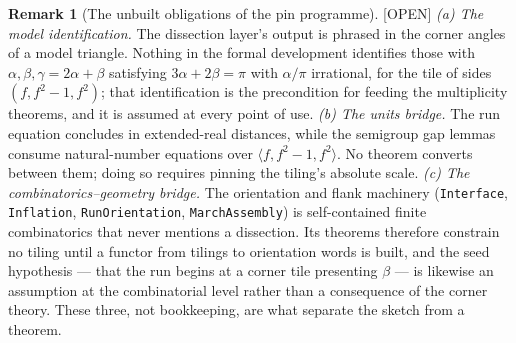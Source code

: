 \documentclass[11pt,reqno]{amsart}
\theoremstyle{plain}
\theoremstyle{definition}
\newtheorem{remark}[theorem]{Remark}
\newcommand{\lab}[1]{\hfill\textnormal{\footnotesize\textsc{[#1]}}}
\begin{document}
\begin{remark}[The unbuilt obligations of the pin programme]\label{rem:pingaps}\lab{OPEN}
\emph{(a) The model identification.} The dissection layer's output is phrased in the corner
angles of a model triangle. Nothing in the formal development identifies those with
$\alpha,\beta,\gamma=2\alpha+\beta$ satisfying $3\alpha+2\beta=\pi$ with $\alpha/\pi$
irrational, for the tile of sides $(f,f^2-1,f^2)$; that identification is the precondition for
feeding the multiplicity theorems, and it is assumed at every point of use.
\emph{(b) The units bridge.} The run equation concludes in extended-real distances, while the
semigroup gap lemmas consume natural-number equations over $\langle f,f^2-1,f^2\rangle$. No
theorem converts between them; doing so requires pinning the tiling's absolute scale.
\emph{(c) The combinatorics--geometry bridge.} The orientation and flank machinery
(\texttt{Interface}, \texttt{Inflation}, \texttt{RunOrientation}, \texttt{MarchAssembly}) is
self-contained finite combinatorics that never mentions a dissection. Its theorems therefore
constrain no tiling until a functor from tilings to orientation words is built, and the seed
hypothesis --- that the run begins at a corner tile presenting $\beta$ --- is likewise an
assumption at the combinatorial level rather than a consequence of the corner theory.
These three, not bookkeeping, are what separate the sketch from a theorem.


\end{remark}
\end{document}
